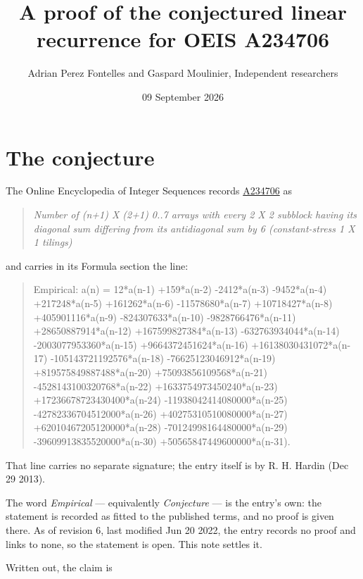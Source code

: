\documentclass[11pt]{article}
\title{A proof of the conjectured linear recurrence for OEIS A234706}
\author{Adrian Perez Fontelles and Gaspard Moulinier, Independent researchers}
\date{09 September 2026}
\theoremstyle{definition}
\begin{document}
\maketitle
\section{The conjecture}

The Online Encyclopedia of Integer Sequences records \href{https://oeis.org/A234706}{A234706} as

\begin{quote}\itshape Number of (n+1) X (2+1) 0..7 arrays with every 2 X 2 subblock having its diagonal sum differing from its antidiagonal sum by 6 (constant-stress 1 X 1 tilings)\end{quote}

and carries in its Formula section the line:

\begin{quote}\ttfamily Empirical: a(n) = 12*a(n-1) +159*a(n-2) -2412*a(n-3) -9452*a(n-4) +217248*a(n-5) +161262*a(n-6) -11578680*a(n-7) +10718427*a(n-8) +405901116*a(n-9) -824307633*a(n-10) -9828766476*a(n-11) +28650887914*a(n-12) +167599827384*a(n-13) -632763934044*a(n-14) -2003077953360*a(n-15) +9664372451624*a(n-16) +16138030431072*a(n-17) -105143721192576*a(n-18) -76625123046912*a(n-19) +819575849887488*a(n-20) +75093856109568*a(n-21) -4528143100320768*a(n-22) +1633754973450240*a(n-23) +17236678723430400*a(n-24) -11938042414080000*a(n-25) -42782336704512000*a(n-26) +40275310510080000*a(n-27) +62010467205120000*a(n-28) -70124998164480000*a(n-29) -39609913835520000*a(n-30) +50565847449600000*a(n-31).\end{quote}

That line carries no separate signature; the entry itself is by R. H. Hardin (Dec 29 2013).

The word {\itshape Empirical} --- equivalently {\itshape Conjecture} --- is the entry's own: the statement is recorded as fitted to the published terms, and no proof is given there. As of revision 6, last modified Jun 20 2022, the entry records no proof and links to none, so the statement is open. This note settles it.

Written out, the claim is
\end{document}
